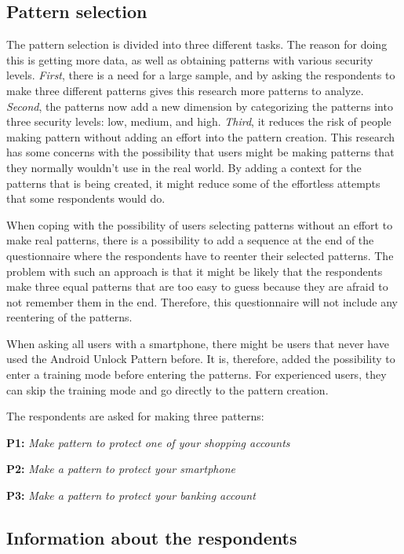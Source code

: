    \subsection*{Pattern selection}
    The pattern selection is divided into three different tasks. The reason for doing this is getting more data, as well as obtaining patterns with various security levels. {\it First}, there is a need for a large sample, and by asking the respondents to make three different patterns gives this research more patterns to analyze. {\it Second}, the patterns now add a new dimension by categorizing the patterns into three security levels: low, medium, and high. {\it Third}, it reduces the risk of people making pattern without adding an effort into the pattern creation. This research has some concerns with the possibility that users might be making patterns that they normally wouldn't use in the real world. By adding a context for the patterns that is being created, it might reduce some of the effortless attempts that some respondents would do.

    When coping with the possibility of users selecting patterns without an effort to make real patterns, there is a possibility to add a sequence at the end of the questionnaire where the respondents have to reenter their selected patterns. The problem with such an approach is that it might be likely that the respondents make three equal patterns that are too easy to guess because they are afraid to not remember them in the end. Therefore, this questionnaire will not include any reentering of the patterns.

    When asking all users with a smartphone, there might be users that never have used the Android Unlock Pattern before. It is, therefore, added the possibility to enter a training mode before entering the patterns. For experienced users, they can skip the training mode and go directly to the pattern creation.

    The respondents are asked for making three patterns:

      {\bf P1:} {\it Make pattern to protect one of your shopping accounts}

      {\bf P2:} {\it Make a pattern to protect your smartphone}

      {\bf P3:} {\it Make a pattern to protect your banking account}

    \clearpage
    \subsection*{Information about the respondents} 

